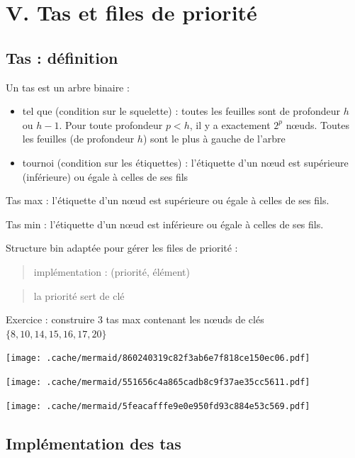 \hypertarget{v.-tas-et-files-de-priorituxe9}{%
\section{V. Tas et files de
priorité}\label{v.-tas-et-files-de-priorituxe9}}

\hypertarget{tas-duxe9finition}{%
\subsection{Tas : définition}\label{tas-duxe9finition}}

Un tas est un arbre binaire :

\begin{itemize}
\tightlist
\item
  tel que (condition sur le squelette) : toutes les feuilles sont de
  profondeur \(h\) ou \(h - 1\). Pour toute profondeur \(p < h\), il y a
  exactement \(2^p\) nœuds. Toutes les feuilles (de profondeur \(h\))
  sont le plus à gauche de l'arbre
\item
  tournoi (condition sur les étiquettes) : l'étiquette d'un nœud est
  supérieure (inférieure) ou égale à celles de ses fils
\end{itemize}

Tas max : l'étiquette d'un nœud est supérieure ou égale à celles de ses
fils.

Tas min : l'étiquette d'un nœud est inférieure ou égale à celles de ses
fils.

Structure bin adaptée pour gérer les files de priorité :

\begin{quote}
implémentation : (priorité, élément)
\end{quote}

\begin{quote}
la priorité sert de clé
\end{quote}

Exercice : construire 3 tas max contenant les nœuds de clés
\(\{8, 10, 14, 15, 16, 17, 20\}\)

\texttt{[image: .cache/mermaid/860240319c82f3ab6e7f818ce150ec06.pdf]}

\texttt{[image: .cache/mermaid/551656c4a865cadb8c9f37ae35cc5611.pdf]}

\texttt{[image: .cache/mermaid/5feacafffe9e0e950fd93c884e53c569.pdf]}

\hypertarget{impluxe9mentation-des-tas}{%
\subsection{Implémentation des tas}\label{impluxe9mentation-des-tas}}

